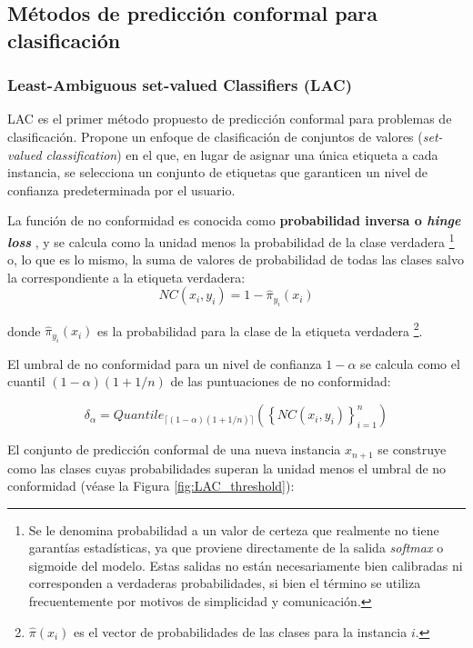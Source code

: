 
\subsection{Métodos de predicción conformal para clasificación}

\subsubsection{Least-Ambiguous set-valued Classifiers (LAC)}

\acrshort{LAC} \cite{sadinle2019} es el primer método propuesto de predicción conformal para problemas de clasificación. Propone un enfoque de clasificación de conjuntos de valores (\textit{set-valued classification}) en el que, en lugar de asignar una única etiqueta a cada instancia, se selecciona un conjunto de etiquetas que garanticen un nivel de confianza predeterminada por el usuario.

La función de no conformidad es conocida como \textbf{probabilidad inversa o \textit{hinge loss}} \cite{johansson2017}, y se calcula como la unidad menos la probabilidad de la clase verdadera%
\footnote{
    Se le denomina probabilidad a un valor de certeza que realmente no tiene garantías estadísticas, ya que proviene directamente de la salida \textit{softmax} o sigmoide del modelo. Estas salidas no están necesariamente bien calibradas ni corresponden a verdaderas probabilidades, si bien el término se utiliza frecuentemente por motivos de simplicidad y comunicación.
}
o, lo que es lo mismo, la suma de valores de probabilidad de todas las clases salvo la correspondiente a la etiqueta verdadera:
$$
NC(x_i,y_i) = 1- \hat{\pi}_{y_i}(x_i)
$$

donde $\hat{\pi}_{y_i}(x_i)$ es la probabilidad para la clase de la etiqueta verdadera%
\footnote{
    $\hat{\pi}(x_i)$ es el vector de probabilidades de las clases para la instancia $i$.
}.


El umbral de no conformidad para un nivel de confianza $1-\alpha$ se calcula como el cuantil 
$(1-\alpha)(1+1/n)$ de las puntuaciones de no conformidad:

$$
\delta_\alpha = Quantile_{ \lceil  (1-\alpha) (1 + 1/n)  \rceil } ( \left\{ NC(x_i,y_i) \right\}_{i=1}^n)
$$

El conjunto de predicción conformal de una nueva instancia $x_{n+1}$ se construye como las clases cuyas probabilidades superan la unidad menos el umbral de no conformidad (véase la Figura \ref{fig:LAC_threshold}):

